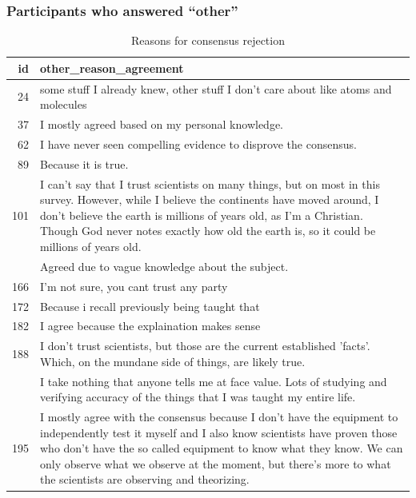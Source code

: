 \documentclass[
  doc,floatsintext]{apa6}
\begin{document}
\subsubsection{Participants who answered ``other''}\label{participants-who-answered-other}

\begin{longtable}[t]{>{}r>{\raggedright\arraybackslash}p{30em}}
\caption{\label{tab:exp3-other-reasons-acceptance}Reasons for consensus rejection}\\
\toprule
id & other\_reason\_agreement\\
\midrule
24 & some stuff I already knew, other stuff I don't care about like atoms and molecules\\
37 & I mostly agreed based on my personal knowledge.\\
62 & I have never seen compelling evidence to disprove the consensus.\\
89 & Because it is true.\\
101 & I can't say that I trust scientists on many things, but on most in this survey. However, while I believe the continents have moved around, I don't believe the earth is millions of years old, as I'm a Christian. Though God never notes exactly how old the earth is, so it could be millions of years old.\\
\addlinespace
102 & Agreed due to vague knowledge about the subject.\\
166 & I'm not sure, you cant trust any party\\
172 & Because i recall previously being taught that\\
182 & I agree because the explaination makes sense\\
188 & I don't trust scientists, but those are the current established 'facts'. Which, on the mundane side of things, are likely true.\\
\addlinespace
189 & I take nothing that anyone tells me at face value. Lots of studying and verifying accuracy of the things that I was taught my entire life.\\
195 & I mostly agree with the consensus because I don't have the equipment to independently test it myself and I also know scientists have proven those who don't have the so called equipment to know what they know. We can only observe what we observe at the moment, but there's more to what the scientists are observing and theorizing.\\
\bottomrule
\end{longtable}
\end{document}
